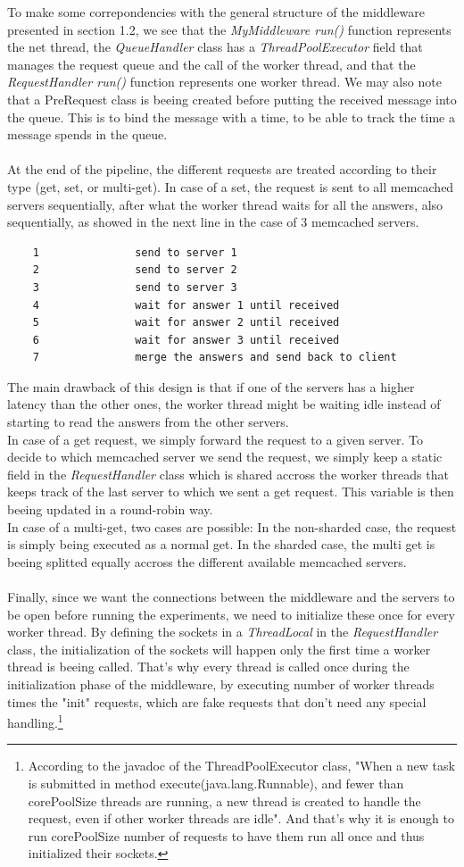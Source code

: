 \documentclass[11pt,a4paper]{article}
\begin{document}
To make some correpondencies with the general structure of the middleware presented in section 1.2, we see that the \textit{MyMiddleware run()} function represents the net thread, the \textit{QueueHandler} class has a \textit{ThreadPoolExecutor} field that manages the request queue and the call of the worker thread, and that the \textit{RequestHandler run()} function represents one worker thread. We may also note that a PreRequest class is beeing created before putting the received message into the queue. This is to bind the message with a time, to be able to track the time a message spends in the queue. 
\\\\
At the end of the pipeline, the different requests are treated according to their type (get, set, or multi-get). In case of a set, the request is sent to all memcached servers sequentially, after what the worker thread waits for all the answers, also sequentially, as showed in the next line in the case of 3 memcached servers. 
\begin{lstlisting}
	1				send to server 1
	2				send to server 2
	3				send to server 3
	4				wait for answer 1 until received
	5				wait for answer 2 until received
	6				wait for answer 3 until received
	7				merge the answers and send back to client
\end{lstlisting}
The main drawback of this design is that if one of the servers has a higher latency than the other ones, the worker thread might be waiting idle instead of starting to read the answers from the other servers. 
\\
In case of a get request, we simply forward the request to a given server. To decide to which memcached server we send the request, we simply keep a static field in the \textit{RequestHandler} class which is shared accross the worker threads that keeps track of the last server to which we sent a get request. This variable is then beeing updated in a round-robin way. 
\\
In case of a multi-get, two cases are possible: In the non-sharded case, the request is simply being executed as a normal get. In the sharded case, the multi get is beeing splitted equally accross the different available memcached servers.   
\\\\
Finally, since we want the connections between the middleware and the servers to be open before running the experiments, we need to initialize these once for every worker thread. By defining the sockets in a \textit{ThreadLocal} in the \textit{RequestHandler} class, the initialization of the sockets will happen only the first time a worker thread is beeing called. That's why every thread is called once during the initialization phase of the middleware, by executing number of worker threads times the "init" requests, which are fake requests that don't need any special handling.\footnote{According to the javadoc of the ThreadPoolExecutor class, "When a new task is submitted in method execute(java.lang.Runnable), and fewer than corePoolSize threads are running, a new thread is created to handle the request, even if other worker threads are idle". And that's why it is enough to run corePoolSize number of requests to have them run all once and thus initialized their sockets.} 
\end{document}
